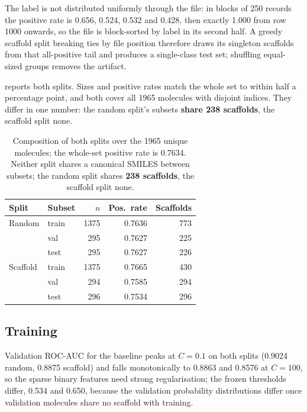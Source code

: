 The label is not distributed uniformly through the file: in blocks of 250 records the positive rate is 0.656, 0.524, 0.532 and 0.428, then exactly 1.000 from row 1000 onwards, so the file is block-sorted by label in its second half. A greedy scaffold split breaking ties by file position therefore draws its singleton scaffolds from that all-positive tail and produces a single-class test set; shuffling equal-sized groups removes the artifact.

 reports both splits. Sizes and positive rates match the whole set to within half a percentage point, and both cover all 1965 molecules with disjoint indices. They differ in one number: the random split's subsets \textbf{share 238 scaffolds}, the scaffold split none.

\begin{table}[htb]
    \centering
    \caption{Composition of both splits over the 1965 unique molecules; the whole-set positive rate is 0.7634. Neither split shares a canonical SMILES between subsets; the random split shares \textbf{238 scaffolds}, the scaffold split none.}
    \label{tab:splits}
    \footnotesize
    \begin{tabular}{@{}llrrr@{}}
        \toprule
        Split & Subset & $n$ & Pos.\ rate & Scaffolds \\
        \midrule
        Random   & train & 1375 & 0.7636 & 773 \\
                 & val   &  295 & 0.7627 & 225 \\
                 & test  &  295 & 0.7627 & 226 \\
        \midrule
        Scaffold & train & 1375 & 0.7665 & 430 \\
                 & val   &  294 & 0.7585 & 294 \\
                 & test  &  296 & 0.7534 & 296 \\
        \bottomrule
    \end{tabular}
\end{table}
\subsection{Training}

Validation ROC-AUC for the baseline peaks at $C = 0.1$ on both splits (0.9024 random, 0.8875 scaffold) and falls monotonically to 0.8863 and 0.8576 at $C = 100$, so the sparse binary features need strong regularisation; the frozen thresholds differ, 0.534 and 0.650, because the validation probability distributions differ once validation molecules share no scaffold with training.

